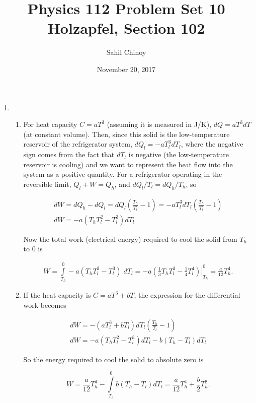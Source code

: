 \documentclass{article}
\title{Physics 112 Problem Set 10 \\ \large{Holzapfel, Section 102}}
\author{Sahil Chinoy}
\date{November 20, 2017}
\begin{document}
\maketitle{}

\begin{enumerate}

	\item

	\begin{enumerate}

		\item

		For heat capacity $C = aT^3$ (assuming it is measured in J/K), $d Q = aT^3 d T$ (at constant volume). Then, since this solid is the low-temperature reservoir of the refrigerator system, $dQ_l = -aT_l^3 dT_l$, where the negative sign comes from the fact that $dT_l$ is negative (the low-temperature reservoir is cooling) and we want to represent the heat flow into the system as a positive quantity. For a refrigerator operating in the reversible limit, $Q_l + W = Q_h$, and $dQ_l / T_l = dQ_h / T_h$, so

		\begin{gather*}
		dW = dQ_h - dQ_l = dQ_l \left( \frac{T_h}{T_l} -1 \right) = -aT_l^3 dT_l \left( \frac{T_h}{T_l} -1 \right) \\
		dW = -a(T_h T_l^2 - T_l^3) dT_l
		\end{gather*}

		Now the total work (electrical energy) required to cool the solid from $T_h$ to 0 is

		\begin{gather*}
		W = \int \limits_{T_h}^0 -a(T_h T_l^2 - T_l^3) \; dT_l = -a \left. \left( \frac{1}{3} T_h T_l^3 - \frac{1}{4} T_l^4 \right) \right|_{T_h}^0 = \frac{a}{12}T_h^4.
		\end{gather*}

		\item

		If the heat capacity is $C = aT^3 + bT$, the expression for the differential work becomes

		\begin{gather*}
		dW =  -(aT_l^3 + bT_l) dT_l \left( \frac{T_h}{T_l} -1 \right) \\
		dW = -a(T_h T_l^2 - T_l^3) dT_l - b(T_h - T_l) dT_l
		\end{gather*}

		So the energy required to cool the solid to absolute zero is

		$$W = \frac{a}{12}T_h^4 - \int \limits_{T_h}^0 b(T_h - T_l) dT_l = \frac{a}{12}T_h^4  + \frac{b}{2} T_h^2.$$


\end{enumerate}
\end{enumerate}
\end{document}
